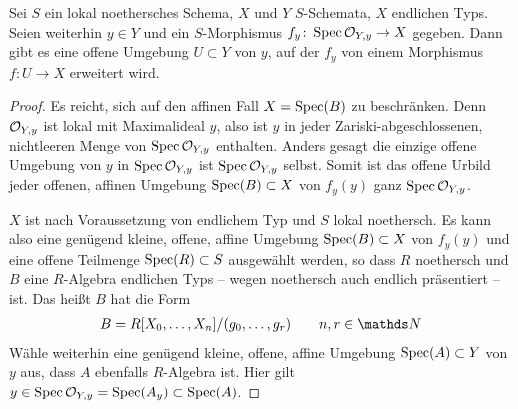 \begin{Lemma}\label{thm:morphismuserweiterung}
  Sei $S$ ein lokal noethersches Schema,
  $X$ und $Y$ $S$-Schemata,
  $X$ endlichen Typs.
  Seien weiterhin $y\in Y$ und 
  ein $S$-Morphismus ${f_y\colon \operatorname{Spec}\mathcal{O}_{Y,y}\to X}$ gegeben.
  Dann gibt es eine offene Umgebung ${U\subset Y}$ von $y$, auf der
  $f_y$ von einem Morphismus ${f\colon U\to X}$ erweitert wird.
  \begin{proof}
    Es reicht, sich auf den affinen Fall $X=\operatorname{Spec}(B)$ zu beschränken.
    Denn $\mathcal{O}_{Y,y}$ ist lokal mit Maximalideal $y$, also ist $y$ in
    jeder Zariski-abgeschlossenen, nichtleeren Menge von $\operatorname{Spec}\mathcal{O}_{Y,y}$
    enthalten. Anders gesagt die einzige offene Umgebung von $y$ in
    $\operatorname{Spec}\mathcal{O}_{Y,y}$ ist $\operatorname{Spec}\mathcal{O}_{Y,y}$ selbst.
    Somit ist das offene Urbild jeder offenen, affinen Umgebung
    $\operatorname{Spec}(B)\subset X$ von $f_y(y)$ ganz $\operatorname{Spec}\mathcal{O}_{Y,y}$.

    $X$ ist nach Voraussetzung von endlichem Typ und $S$ lokal
    noethersch.
    Es kann also eine genügend kleine, offene, affine Umgebung
    $\operatorname{Spec}(B)\subset X$ von $f_y(y)$ und eine offene Teilmenge
    $\operatorname{Spec}(R)\subset S$ ausgewählt werden,
    so dass $R$ noethersch und $B$ eine $R$-Algebra endlichen Typs
    – wegen noethersch auch endlich präsentiert – ist. Das heißt $B$
    hat die Form
    \begin{gather*}
      B=R[X_0,\dotsc, X_n]/(g_0,\dotsc, g_r)\qquad n,r\in\N
    \end{gather*}
    Wähle weiterhin eine genügend kleine, offene, affine Umgebung
    $\operatorname{Spec}(A)\subset Y$ von $y$ aus, dass $A$ ebenfalls $R$-Algebra ist.
    Hier gilt $y\in\operatorname{Spec}\mathcal{O}_{Y,y}=\operatorname{Spec}(A_y)\subset\operatorname{Spec}(A)$.
    

\end{proof}
\end{Lemma}
